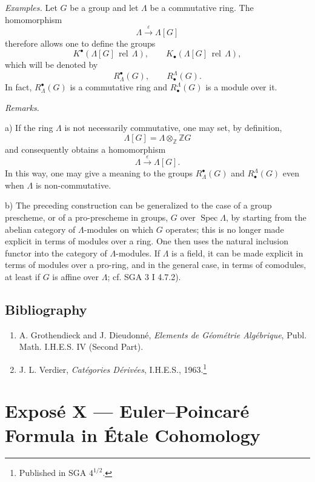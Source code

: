 \documentclass[11pt]{article}
\DeclareMathOperator{\Spec}{Spec}
\providecommand{\Spec}{\operatorname{Spec}}
\providecommand{\Spec}{\operatorname{Spec}}
\providecommand{\Spec}{\operatorname{Spec}}
\providecommand{\Spec}{\operatorname{Spec}}
\begin{document}
\emph{Examples.} Let $G$ be a group and let $\Lambda$ be a commutative ring. The homomorphism
\[
\Lambda\xrightarrow{\varepsilon}\Lambda[G]
\]
therefore allows one to define the groups
\[
K^\bullet(\Lambda[G]\operatorname{\,rel\,}\Lambda),\qquad
K_\bullet(\Lambda[G]\operatorname{\,rel\,}\Lambda),
\]
which will be denoted by
\[
R^\bullet_\Lambda(G),\qquad R^\Lambda_\bullet(G).
\]
In fact, $R^\bullet_\Lambda(G)$ is a commutative ring and $R^\Lambda_\bullet(G)$ is a module over it.

\emph{Remarks.}

a) If the ring $\Lambda$ is not necessarily commutative, one may set, by definition,
\[
\Lambda[G]=\Lambda\otimes_{\mathbb Z}\mathbb ZG
\]
and consequently obtains a homomorphism
\[
\Lambda\xrightarrow{\varepsilon}\Lambda[G].
\]
In this way, one may give a meaning to the groups $R^\bullet_\Lambda(G)$ and $R^\Lambda_\bullet(G)$ even when $\Lambda$ is non-commutative.

b) The preceding construction can be generalized to the case of a group prescheme, or of a pro-prescheme in groups, $G$ over $\Spec\Lambda$, by starting from the abelian category of $\Lambda$-modules on which $G$ operates; this is no longer made explicit in terms of modules over a ring. One then uses the natural inclusion functor into the category of $\Lambda$-modules. If $\Lambda$ is a field, it can be made explicit in terms of modules over a pro-ring, and in the general case, in terms of comodules, at least if $G$ is affine over $\Lambda$; cf. SGA 3 I 4.7.2).

\subsection*{Bibliography}

\begin{enumerate}
\item[{[1]}] A. Grothendieck and J. Dieudonné, \emph{Elements de Géométrie Algébrique}, Publ. Math. I.H.E.S. IV (Second Part).
\item[{[2]}] J. L. Verdier, \emph{Catégories Dérivées}, I.H.E.S., 1963.\footnote{Published in SGA $4^{1/2}$.}
\end{enumerate}

\label{sga5:X:expose:x}\section*{Exposé X --- Euler--Poincaré Formula in Étale Cohomology}
\end{document}
